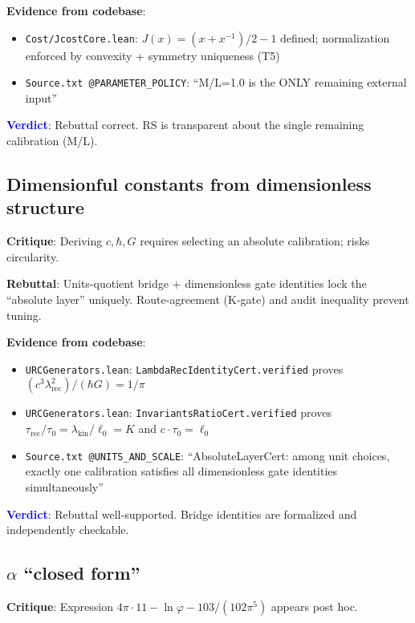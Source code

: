 \documentclass[11pt]{article}
\begin{document}
\noindent\textbf{Evidence from codebase}:
\begin{itemize}
\item \texttt{Cost/JcostCore.lean}: $J(x)=(x+x^{-1})/2-1$ defined; normalization enforced by convexity + symmetry uniqueness (T5)
\item \texttt{Source.txt @PARAMETER\_POLICY}: ``M/L=1.0 is the ONLY remaining external input''
\end{itemize}

\noindent\textcolor{blue}{\textbf{Verdict}}: Rebuttal correct. RS is transparent about the single remaining calibration (M/L).

\subsection{Dimensionful constants from dimensionless structure}

\textbf{Critique}: Deriving $c,\hbar,G$ requires selecting an absolute calibration; risks circularity.

\textbf{Rebuttal}: Units-quotient bridge + dimensionless gate identities lock the ``absolute layer'' uniquely. Route-agreement (K-gate) and audit inequality prevent tuning.

\noindent\textbf{Evidence from codebase}:
\begin{itemize}
\item \texttt{URCGenerators.lean}: \texttt{LambdaRecIdentityCert.verified} proves $(c^3 \lambda_{\text{rec}}^2)/(\hbar G) = 1/\pi$
\item \texttt{URCGenerators.lean}: \texttt{InvariantsRatioCert.verified} proves $\tau_{\text{rec}}/\tau_0 = \lambda_{\text{kin}}/\ell_0 = K$ and $c\cdot\tau_0=\ell_0$
\item \texttt{Source.txt @UNITS\_AND\_SCALE}: ``AbsoluteLayerCert: among unit choices, exactly one calibration satisfies all dimensionless gate identities simultaneously''
\end{itemize}

\noindent\textcolor{blue}{\textbf{Verdict}}: Rebuttal well-supported. Bridge identities are formalized and independently checkable.

\subsection{$\alpha$ ``closed form''}

\textbf{Critique}: Expression $4\pi\cdot 11 - \ln\varphi - 103/(102\pi^5)$ appears post hoc.
\end{document}
